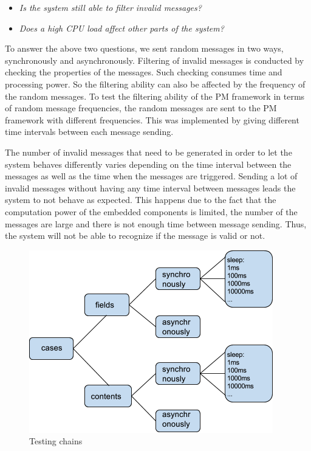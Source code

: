  \begin{itemize}
 \item {\em Is the system still able to filter invalid messages?} 
 \item {\em Does a high CPU load affect other parts of the system?} 
 \end{itemize}
 
 To answer the above two questions, we sent random messages in two ways, synchronously and asynchronously.
Filtering of invalid messages is conducted by checking the properties of the messages. Such checking consumes time and processing power. So the filtering ability can also be affected by the frequency of the random messages. To test the filtering ability of the PM framework in terms of random message frequencies, the random messages are sent to the PM framework with different frequencies. This was implemented by giving different time intervals between each message sending. 

The number of invalid messages that need to be generated in order to let the system behaves differently varies depending on the time interval between the messages as well as the time when the messages are triggered. Sending a lot of invalid messages without having any time interval between messages leads the system to not behave as expected. This happens due to the fact that the computation power of the embedded components is limited, the number of the messages are large and there is not enough time between message sending. Thus, the system will not be able to recognize if the message is valid or not. 

\begin{figure}[h!]
\centering
\includegraphics[width=.8\columnwidth]{figure/testingchain.png}
\caption{Testing chains \label{testingchain}}
\end{figure}

